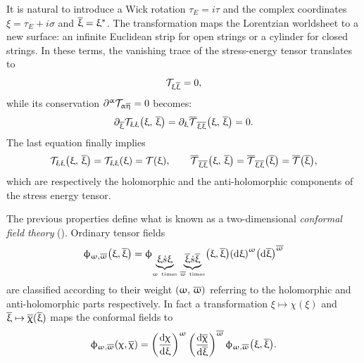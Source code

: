 It is natural to introduce a Wick rotation $\tau_E = i \tau$ and the complex coordinates $\xi = \tau_E + i \sigma$ and $\overline{\upxi} = \upxi^*$.
The transformation maps the Lorentzian worldsheet to a new surface: an infinite Euclidean strip for open strings or a cylinder for closed strings.
In these terms, the vanishing trace of the stress-energy tensor translates to
\begin{equation}
  \mathcal{T}_{\upxi \overline{\upxi}} = 0,
\end{equation}
while its conservation $\partial^{\upalpha} \mathcal{T}_{\upalpha\overline{\upeta}} = 0$ becomes:\footnotemark{}
\begin{equation}
  \partial_{\overline{\upxi}} \mathcal{T}_{\upxi\upxi}\qty( \upxi,\, \overline{\upxi} )
  =
  \partial_{\upxi} \overline{\mathcal{T}}_{\overline{\upxi}\overline{\upxi}}\qty( \upxi,\, \overline{\upxi} )
  =
  0.
\end{equation}
The last equation finally implies
\begin{equation}
  \mathcal{T}_{\upxi\upxi}\qty( \upxi,\, \overline{\upxi} )
  =
  \mathcal{T}_{\upxi\upxi}\qty( \upxi )
  =
  \mathcal{T}\qty( \upxi ),
  \qquad
  \overline{\mathcal{T}}_{\overline{\upxi}\overline{\upxi}}\qty( \upxi,\, \overline{\upxi} )
  =
  \overline{\mathcal{T}}_{\overline{\upxi}\overline{\upxi}}\qty( \overline{\upxi} )
  =
  \overline{\mathcal{T}}\qty( \overline{\upxi} ),
\end{equation}
which are respectively the holomorphic and the anti-holomorphic components of the stress energy tensor.

The previous properties define what is known as a two-dimensional \emph{conformal field theory} (\cft).
Ordinary tensor fields
\begin{equation}
  \upphi_{\upomega, \overline{\upomega}}\qty( \upxi, \overline{\upxi} )
  =
  \upphi_{\underbrace{\upxi \dot{s} \upxi}\limits_{\upomega~\text{times}}\, \underbrace{\overline{\upxi} \dot{s} \overline{\upxi}}\limits_{\overline{\upomega}~\text{times}}}\qty( \upxi, \overline{\upxi} )
  \qty( \dd{\ensuremath{\upxi}} )^{\upomega}
  \qty( \dd{\ensuremath{\overline{\upxi}}} )^{\overline{\upomega}}
\end{equation}
are classified according to their weight $\qty( \upomega,\, \overline{\upomega} )$ referring to the holomorphic and anti-holomorphic parts respectively.
In fact a transformation $\xi \mapsto \chi(\xi)$ and $\overline{\upxi} \mapsto \overline{\upchi}(\overline{\upxi})$ maps the conformal fields to
\begin{equation}
  \upphi_{\upomega, \overline{\upomega}}\qty( \upchi, \overline{\upchi} )
  =
  \qty( \dv{\ensuremath{\upchi}}{\ensuremath{\upxi}} )^{\upomega}\,
  \qty( \dv{\ensuremath{\overline{\upchi}}}{\ensuremath{\overline{\upxi}}} )^{\overline{\upomega}}\,
  \upphi_{\upomega, \overline{\upomega}}\qty( \upxi, \overline{\upxi} ).
\end{equation}

